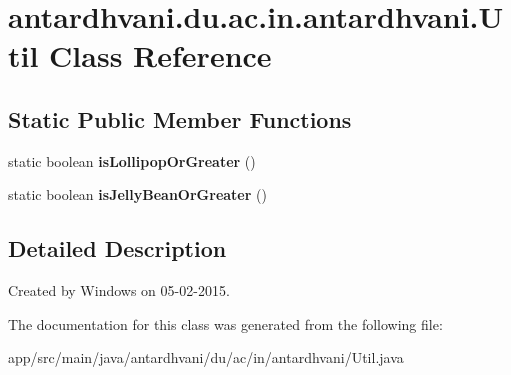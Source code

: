 \hypertarget{classantardhvani_1_1du_1_1ac_1_1in_1_1antardhvani_1_1_util}{}\section{antardhvani.\+du.\+ac.\+in.\+antardhvani.\+Util Class Reference}
\label{classantardhvani_1_1du_1_1ac_1_1in_1_1antardhvani_1_1_util}
\subsection*{Static Public Member Functions}
\begin{DoxyCompactItemize}
\item 
\hypertarget{classantardhvani_1_1du_1_1ac_1_1in_1_1antardhvani_1_1_util_aa08f0bef5addf25a796b89fe67256d55}{}static boolean {\bfseries is\+Lollipop\+Or\+Greater} ()\label{classantardhvani_1_1du_1_1ac_1_1in_1_1antardhvani_1_1_util_aa08f0bef5addf25a796b89fe67256d55}

\item 
\hypertarget{classantardhvani_1_1du_1_1ac_1_1in_1_1antardhvani_1_1_util_ae7d5f14e35cd2c8d8be48a9ad00ea3a0}{}static boolean {\bfseries is\+Jelly\+Bean\+Or\+Greater} ()\label{classantardhvani_1_1du_1_1ac_1_1in_1_1antardhvani_1_1_util_ae7d5f14e35cd2c8d8be48a9ad00ea3a0}

\end{DoxyCompactItemize}


\subsection{Detailed Description}
Created by Windows on 05-\/02-\/2015. 

The documentation for this class was generated from the following file\+:\begin{DoxyCompactItemize}
\item 
app/src/main/java/antardhvani/du/ac/in/antardhvani/Util.\+java\end{DoxyCompactItemize}
